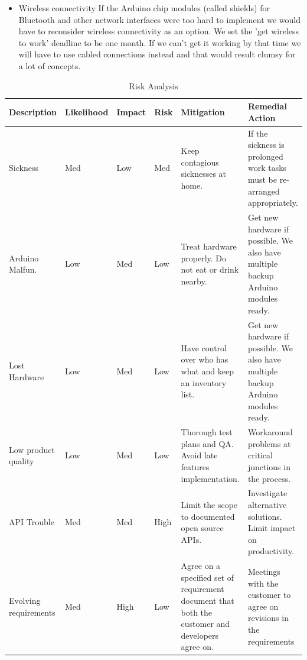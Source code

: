 \begin{itemize}
\item{Wireless connectivity}\newline
If the Arduino chip modules (called shields) for Bluetooth and other network interfaces were too
hard to implement we would have to reconsider wireless connectivity as an option.
We set the 'get wireless to work' deadline to be one month. If we can't get it working
by that time we will have to use cabled connections instead and that would result clumsy
for a lot of concepts.
\end{itemize}

\begin{table}
	\begin{center}
		\caption{Risk Analysis}
		\begin{tabular}{| l | l | l | l | p{2.8cm} | p{3cm} |}
		\hline

\textbf{Description} & \textbf{Likelihood} & \textbf{Impact} & \textbf{Risk} & \textbf{Mitigation} & \textbf{Remedial Action}\\ \hline

Sickness 			& Med & Low & Med & Keep contagious sicknesses at home.
					& If the sickness is prolonged work tasks must be re-arranged appropriately. \\ \hline


Arduino Malfun.		& Low & Med & Low & Treat hardware properly. Do not eat or drink nearby.
					&  Get new hardware if possible. We also have multiple backup Arduino modules ready. \\ \hline

Lost Hardware		& Low & Med & Low & Have control over who has what and keep an inventory list.
					& Get new hardware if possible. We also have multiple backup Arduino modules ready. \\ \hline

Low product quality		& Low & Med & Low & Thorough test plans  and QA. Avoid late features implementation.
					&  Workaround problems at critical junctions in the process.\\ \hline

API Trouble			& Med & Med & High & Limit the scope to documented open source APIs.
					& Investigate alternative solutions. Limit impact on productivity. \\ \hline

Evolving requirements	& Med & High & Low & Agree on a specified set of requirement document that both the customer and developers agree on.
					& Meetings with the customer to agree on revisions in the requirements \\ \hline


\end{tabular}
\end{center}
\end{table}
